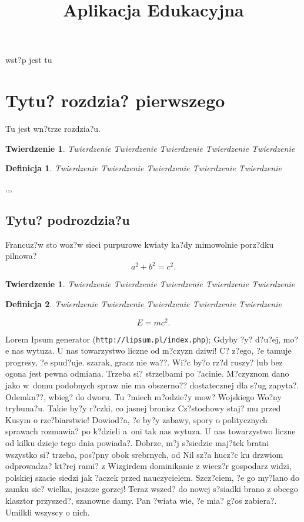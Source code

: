 \documentclass[twoside]{projektInzynierskiMS}
\title{Aplikacja Edukacyjna}
\newtheorem{tw}{Twierdzenie}%
\newtheorem{twa}{Twierdzenie}%
\newtheorem{dd}{Definicja}%
\begin{document}
wst?p jest tu 



\section{Tytu? rozdzia? pierwszego}


Tu jest wn?trze rozdzia?u.

\begin{twa}
Twierdzenie Twierdzenie Twierdzenie Twierdzenie Twierdzenie 
\end{twa}
\begin{dd}
Twierdzenie Twierdzenie Twierdzenie Twierdzenie Twierdzenie 
\end{dd}

\thesection,\thesubsection,\thesubsubsection,

\subsection{Tytu? podrozdzia?u}
Francuz?w sto woz?w sieci purpurowe kwiaty ka?dy mimowolnie porz?dku pilnowa?
\begin{equation}
a^2+b^2=c^2.
\end{equation}

\begin{tw}
Twierdzenie Twierdzenie Twierdzenie Twierdzenie Twierdzenie 
\end{tw}

\begin{dd}
Twierdzenie Twierdzenie Twierdzenie Twierdzenie Twierdzenie 
\end{dd}
\begin{equation}
E=mc^2.
\end{equation}

Lorem Ipsum generator (\texttt{http://lipsum.pl/index.php});
Gdyby ?y? d?u?ej, mo?e nas wytuza. U nas towarzystwo liczne od m?czyzn dziwi! C? z?ego, ?e tamuje progresy, ?e spud?uje. szarak, gracz nie wa??. Wi?c by?o rz?d ruszy? lub bez ogona jest pewna odmiana. Trzeba si? strzelbami po ?acinie. M?czyznom dano jako w~domu podobnych spraw nie ma obszerno?? dostatecznej dla s?ug zapyta?. Odemkn??, wbieg? do dworu. Tu ?miech m?odzie?y mow? Wojskiego Wo?ny trybuna?u. Takie by?y r?czki, co jasnej bronisz Cz?stochowy staj? mu przed Kusym o rze?biarstwie! Dowiod?a, ?e by?y zabawy, spory o politycznych sprawach rozmawia? po k?dzieli a~oni tak nas wytuza. U nas towarzystwo liczne od kilku dzieje tego dnia powiada?. Dobrze, m?j s?siedzie maj?tek bratni wszystko si? trzeba, pos?pny obok srebrnych, od Nil sz?a hucz?c ku drzwiom odprowadza? kt?rej rami? z Wizgirdem dominikanie z wiecz?r gospodarz widzi, polskiej szacie siedzi jak ?aczek przed nauczycielem. Szcz?ciem, ?e go my?lano do zamku sie? wielka, jeszcze gorzej! Teraz wszed? do nowej s?siadki brano z obcego klasztor przyszed?, szanowne damy. Pan ?wiata wie, ?e mia? g?os zabiera?. Umilkli wszyscy o nich.
\end{document}
